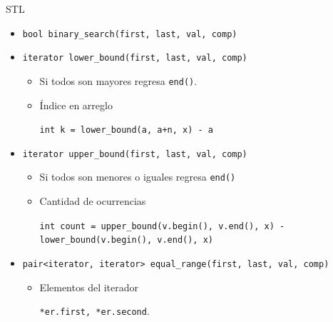 \begin{frame}{STL}
  \begin{itemize}
  \item \texttt{bool binary\_search(first, last, val, comp)}
  \item \texttt{iterator lower\_bound(first, last, val, comp)}
    \begin{itemize}
    \item Si todos son mayores regresa \texttt{end()}.
    \item Índice en arreglo
      
      \texttt{int k = lower\_bound(a, a+n, x) - a}
    \end{itemize}
  \item \texttt{iterator upper\_bound(first, last, val, comp)}
    \begin{itemize}
    \item Si todos son menores o iguales regresa \texttt{end()}
    \item Cantidad de ocurrencias
      
      \texttt{int count = upper\_bound(v.begin(), v.end(), x) -
        lower\_bound(v.begin(), v.end(), x)}
    \end{itemize}
  \item \texttt{pair<iterator, iterator> equal\_range(first, last, val, comp)}
    \begin{itemize}
    \item Elementos del iterador

      \texttt{*er.first, *er.second}.
    \end{itemize}
  \end{itemize}
\end{frame}
